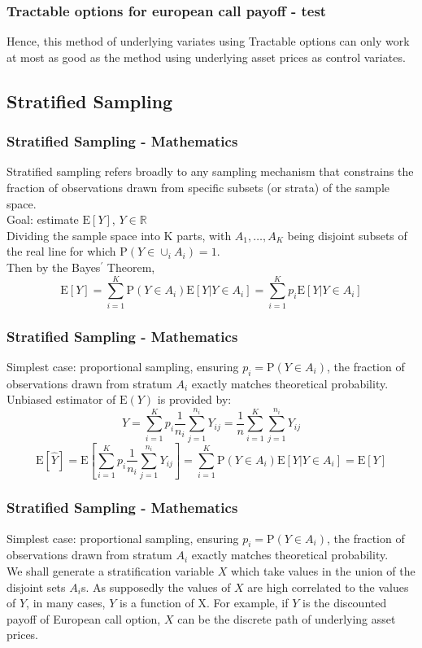 \documentclass{beamer}
\begin{document}
\begin{frame}
\frametitle{Tractable options for european call payoff - test}
Hence, this method of underlying variates using Tractable options can only work at most as good as the method using underlying asset prices as control variates.
\end{frame}

\subsection{Stratified Sampling}

\begin{frame}
\frametitle{Stratified Sampling - Mathematics}
Stratified sampling refers broadly to any sampling mechanism that constrains
the fraction of observations drawn from specific subsets (or strata) of the
sample space. \\
Goal: estimate $\mathrm{E}[Y]$, $Y \in \mathbb{R}$\\
Dividing the sample space into K parts, with $A_{1}, \dots ,A_{K}$ being disjoint subsets of the real line for which $\mathrm{P}(Y \in \cup_{i}A_{i}) = 1$. \\
Then by the Bayes$^{\prime}$ Theorem,
$$ \mathrm{E}[Y] = \sum_{i=1}^{K}\mathrm{P}(Y \in A_{i})\mathrm{E}[Y|Y \in A_{i}] = \sum_{i=1}^{K}p_{i}\mathrm{E}[Y|Y \in A_{i}] $$
\end{frame}

\begin{frame}
\frametitle{Stratified Sampling - Mathematics}
Simplest case: proportional sampling, ensuring $p_{i} = \mathrm{P}(Y \in A_{i})$, the fraction of observations drawn from stratum $A_{i}$ exactly matches theoretical probability.\\
Unbiased estimator of $\mathrm{E}(Y)$ is provided by:\\
$$\hat{Y} = \sum_{i=1}^{K} p_{i} \frac{1}{n_{i}} \sum_{j=1}^{n_{i}} Y_{ij} = \frac{1}{n} \sum_{i=1}^{K} \sum_{j=1}^{n_{i}} Y_{ij}$$
$$ \mathrm{E}[\hat{Y}] = \mathrm{E}[\sum_{i=1}^{K} p_{i} \frac{1}{n_{i}} \sum_{j=1}^{n_{i}} Y_{ij}] = \sum_{i=1}^{K}\mathrm{P}(Y \in A_{i})\mathrm{E}[Y|Y \in A_{i}] = \mathrm{E}[Y]$$
\end{frame}

\begin{frame}
\frametitle{Stratified Sampling - Mathematics}
Simplest case: proportional sampling, ensuring $p_{i} = \mathrm{P}(Y \in A_{i})$, the fraction of observations drawn from stratum $A_{i}$ exactly matches theoretical probability.\\
We shall generate a stratification variable $X$ which take values in the union of the disjoint sets $A_{i}$s. As supposedly the values of $X$ are high correlated to the values of $Y$, in many cases, $Y$ is a function of X. For example, if $Y$ is the discounted payoff of European call option, $X$ can be the discrete path of underlying asset prices.\\
\end{frame}
\end{document}
